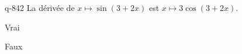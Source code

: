 \begin{truefalse}{q-842}
La dérivée de $x\mapsto \sin(3+2x)$ est $x\mapsto 3\cos(3+2x)$.
\item Vrai
\item* Faux
\end{truefalse}

